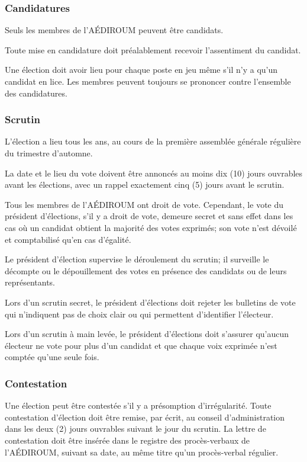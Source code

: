 \documentclass[12pt]{article}
\begin{document}
\subsubsection{Candidatures}

Seuls les membres de l'AÉDIROUM peuvent être candidats.

Toute mise en candidature doit préalablement recevoir l'assentiment du candidat.

Une élection doit avoir lieu pour chaque poste en jeu même s'il n'y a qu'un candidat en lice. Les membres peuvent 
toujours se prononcer contre l'ensemble des candidatures.

\subsubsection{Scrutin}

L'élection a lieu tous les ans, au cours de la première assemblée générale régulière du trimestre d'automne.

La date et le lieu du vote doivent être annoncés au moins dix (10) jours ouvrables avant les élections, avec un rappel exactement cinq (5) jours avant le scrutin.

Tous les membres de l'AÉDIROUM ont droit de vote. Cependant, le vote du président d'élections, s'il y a droit de vote, demeure secret et sans effet dans les cas où un candidat obtient la majorité des votes exprimés; son vote n'est dévoilé et comptabilisé qu'en cas d'égalité.

Le président d'élection supervise le déroulement du scrutin; il surveille le décompte ou le dépouillement des votes en présence des candidats ou de leurs représentants.

Lors d'un scrutin secret, le président d'élections doit rejeter les bulletins de vote qui n'indiquent pas de choix clair ou qui permettent d'identifier l'électeur.

Lors d'un scrutin à main levée, le président d'élections doit s'assurer qu'aucun électeur ne vote pour plus d'un candidat et que chaque voix exprimée n'est comptée qu'une seule fois.

\subsubsection{Contestation}

Une élection peut être contestée s'il y a présomption d'irrégularité. Toute contestation d'élection doit être remise, par écrit, au conseil d'administration dans les deux (2) jours ouvrables suivant le jour du scrutin. La lettre de contestation doit être insérée dans le registre des procès-verbaux de l'AÉDIROUM, suivant sa date, au même titre qu'un procès-verbal régulier.
\end{document}
